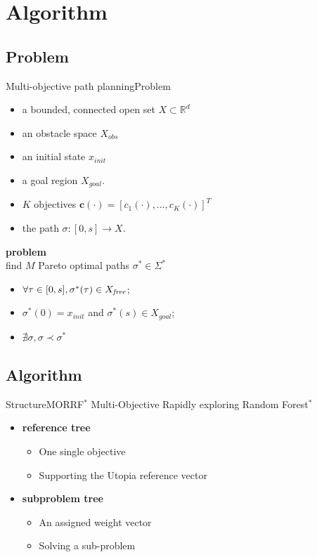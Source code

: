 \section{Algorithm}

\subsection{Problem}

\begin{frame}{Multi-objective path planning}{Problem}
	
\begin{itemize}
\item a bounded, connected open set $ X \subset \mathbb{R}^{d} $
\item an obstacle space $ X_{obs} $
\item an initial state $ x_{init} $
\item a goal region $ X_{goal} $. 
\item $K$ objectives  $ \bm{c}(\cdot) = [ c_{1} (\cdot), \ldots , c_{K}(\cdot) ]^{T}$ 
\item the path  $\sigma : [0,s] \rightarrow X$. 
\end{itemize}

\textbf{problem} \\
find $ M $ Pareto optimal paths $ \sigma^{*} \in \Sigma^{*}$ 
\begin{itemize}
\item $\forall \tau\in[0,s], \sigma^*(\tau) \in X_{\it free}$;
\item $ \sigma^{*} (0) = x_{init} $ and $ \sigma^{*} (s) \in X_{goal}  $;
\item $ \nexists \sigma, \sigma \prec \sigma^{*} $     
\end{itemize}                        
	
\end{frame}

\subsection{Algorithm}

\begin{frame}{Structure}{MORRF$^{*}$}
Multi-Objective Rapidly exploring Random Forest$^{*}$
\begin{itemize}
	\item \textbf{reference tree}
	\begin{itemize}
	\item One single objective
	\item Supporting the Utopia reference vector
	\end{itemize}	
	\item \textbf{subproblem tree}
	\begin{itemize}
	\item An assigned weight vector 
	\item Solving a sub-problem
	\end{itemize}
\end{itemize}
\end{frame}

